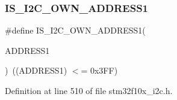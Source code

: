 \subsubsection{\texorpdfstring{I\+S\+\_\+\+I2\+C\+\_\+\+O\+W\+N\+\_\+\+A\+D\+D\+R\+E\+S\+S1}{IS\_I2C\_OWN\_ADDRESS1}}
{\footnotesize\ttfamily \#define I\+S\+\_\+\+I2\+C\+\_\+\+O\+W\+N\+\_\+\+A\+D\+D\+R\+E\+S\+S1(\begin{DoxyParamCaption}\item[{}]{A\+D\+D\+R\+E\+S\+S1 }\end{DoxyParamCaption})~((A\+D\+D\+R\+E\+S\+S1) $<$= 0x3\+F\+F)}



Definition at line 510 of file stm32f10x\+\_\+i2c.\+h.

